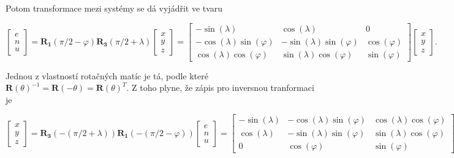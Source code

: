 \documentclass[11pt,a4paper]{article}
\begin{document}
Potom transformace mezi systémy se dá vyjádřit ve tvaru

\begin{equation}
\begin{bmatrix}
e \\
n \\
u
\end{bmatrix} =
\mathbf{R_{1}}\left(\pi/2-\varphi\right)\mathbf{R_{3}}\left(\pi/2+\lambda\right)
\begin{bmatrix}
x \\
y \\
z
\end{bmatrix} =
\begin{bmatrix}
-\sin{\left(\lambda\right)} & \cos{\left(\lambda\right)} & 0 \\
-\cos{\left(\lambda\right)}\sin{\left(\varphi\right)} & -\sin{\left(\lambda\right)}\sin{\left(\varphi\right)} & \cos{\left(\varphi\right)} \\
\cos{\left(\lambda\right)}\cos{\left(\varphi\right)} & \sin{\left(\lambda\right)}\cos{\left(\varphi\right)} & \sin{\left(\varphi\right)}
\end{bmatrix}
\begin{bmatrix}
x \\
y \\
z
\end{bmatrix}.
\label{rov:ecef2enu2}
\end{equation}

Jednou z vlastností rotačných matíc je tá, podle které $\mathbf{R}\left(\theta\right)^{-1} = \mathbf{R}\left(-\theta\right) = \mathbf{R}\left(\theta\right)^{T}$. Z toho plyne, že zápis pro inversnou tranformaci je

\begin{equation}
\begin{bmatrix}
x \\
y \\
z
\end{bmatrix} =
\mathbf{R_{3}}\left(-\left(\pi/2+\lambda\right)\right)\mathbf{R_{1}}\left(-\left(\pi/2-\varphi\right)\right)
\begin{bmatrix}
e \\
n \\
u
\end{bmatrix} = 
\begin{bmatrix}
-\sin{\left(\lambda\right)} & -\cos{\left(\lambda\right)}\sin{\left(\varphi\right)} & \cos{\left(\lambda\right)}\cos{\left(\varphi\right)} \\
 \cos{\left(\lambda\right)} & -\sin{\left(\lambda\right)}\sin{\left(\varphi\right)} & \sin{\left(\lambda\right)}\cos{\left(\varphi\right)} \\
 0  &  \cos{\left(\varphi\right)} & \sin{\left(\varphi\right)} 
\end{bmatrix}
\begin{bmatrix}
e \\
n \\
u
\end{bmatrix}.
\label{rov:ecef2enu3}
\end{equation}
\end{document}
